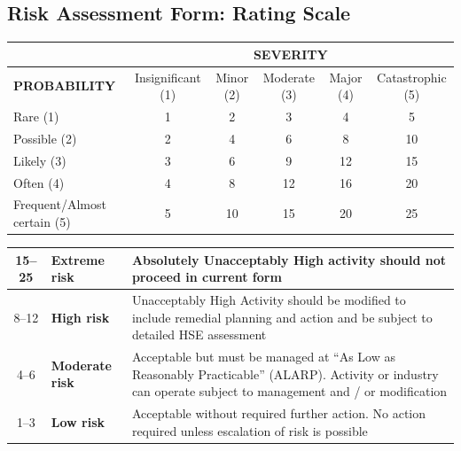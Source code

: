 \subsection*{Risk Assessment Form: Rating Scale}
\begin{center}\footnotesize\setlength{\tabcolsep}{4pt}\renewcommand{\arraystretch}{1.4}
\begin{tabular}{|l|c|c|c|c|c|}
\hline
 & \multicolumn{5}{c|}{\textbf{SEVERITY}}\\
\hline
\textbf{PROBABILITY} & Insignificant (1) & Minor (2) & Moderate (3) & Major (4) & Catastrophic (5)\\
\hline
Rare (1) & \cellcolor{green!60!black}1 & \cellcolor{green!60!black}2 & \cellcolor{green!60!black}3 & \cellcolor{yellow}4 & \cellcolor{yellow}5\\
\hline
Possible (2) & \cellcolor{green!60!black}2 & \cellcolor{yellow}4 & \cellcolor{yellow}6 & \cellcolor{orange}8 & \cellcolor{orange}10\\
\hline
Likely (3) & \cellcolor{green!60!black}3 & \cellcolor{yellow}6 & \cellcolor{orange}9 & \cellcolor{orange}12 & \cellcolor{red}15\\
\hline
Often (4) & \cellcolor{yellow}4 & \cellcolor{orange}8 & \cellcolor{orange}12 & \cellcolor{red}16 & \cellcolor{red}20\\
\hline
Frequent/Almost certain (5) & \cellcolor{yellow}5 & \cellcolor{orange}10 & \cellcolor{red}15 & \cellcolor{red}20 & \cellcolor{red}25\\
\hline
\end{tabular}

\bigskip
\begin{tabular}{|c|l|L{9.6cm}|}
\hline
{}15--25 & \textbf{Extreme risk} & Absolutely Unacceptably High activity should not proceed in current form\\
\hline
{}8--12 & \textbf{High risk} & Unacceptably High Activity should be modified to include remedial planning and action
and be subject to detailed HSE assessment\\
\hline
{}4--6 & \textbf{Moderate risk} & Acceptable but must be managed at ``As Low as Reasonably Practicable'' (ALARP). Activity
or industry can operate subject to management and / or modification\\
\hline
{}1--3 & \textbf{Low risk} & Acceptable without required further action. No action required unless escalation of
risk is possible\\
\hline
\end{tabular}


\end{center}
